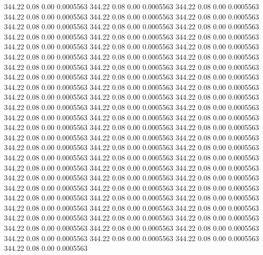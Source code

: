  344.22    0.08    0.00   0.0005563
 344.22    0.08    0.00   0.0005563
 344.22    0.08    0.00   0.0005563
 344.22    0.08    0.00   0.0005563
 344.22    0.08    0.00   0.0005563
 344.22    0.08    0.00   0.0005563
 344.22    0.08    0.00   0.0005563
 344.22    0.08    0.00   0.0005563
 344.22    0.08    0.00   0.0005563
 344.22    0.08    0.00   0.0005563
 344.22    0.08    0.00   0.0005563
 344.22    0.08    0.00   0.0005563
 344.22    0.08    0.00   0.0005563
 344.22    0.08    0.00   0.0005563
 344.22    0.08    0.00   0.0005563
 344.22    0.08    0.00   0.0005563
 344.22    0.08    0.00   0.0005563
 344.22    0.08    0.00   0.0005563
 344.22    0.08    0.00   0.0005563
 344.22    0.08    0.00   0.0005563
 344.22    0.08    0.00   0.0005563
 344.22    0.08    0.00   0.0005563
 344.22    0.08    0.00   0.0005563
 344.22    0.08    0.00   0.0005563
 344.22    0.08    0.00   0.0005563
 344.22    0.08    0.00   0.0005563
 344.22    0.08    0.00   0.0005563
 344.22    0.08    0.00   0.0005563
 344.22    0.08    0.00   0.0005563
 344.22    0.08    0.00   0.0005563
 344.22    0.08    0.00   0.0005563
 344.22    0.08    0.00   0.0005563
 344.22    0.08    0.00   0.0005563
 344.22    0.08    0.00   0.0005563
 344.22    0.08    0.00   0.0005563
 344.22    0.08    0.00   0.0005563
 344.22    0.08    0.00   0.0005563
 344.22    0.08    0.00   0.0005563
 344.22    0.08    0.00   0.0005563
 344.22    0.08    0.00   0.0005563
 344.22    0.08    0.00   0.0005563
 344.22    0.08    0.00   0.0005563
 344.22    0.08    0.00   0.0005563
 344.22    0.08    0.00   0.0005563
 344.22    0.08    0.00   0.0005563
 344.22    0.08    0.00   0.0005563
 344.22    0.08    0.00   0.0005563
 344.22    0.08    0.00   0.0005563
 344.22    0.08    0.00   0.0005563
 344.22    0.08    0.00   0.0005563
 344.22    0.08    0.00   0.0005563
 344.22    0.08    0.00   0.0005563
 344.22    0.08    0.00   0.0005563
 344.22    0.08    0.00   0.0005563
 344.22    0.08    0.00   0.0005563
 344.22    0.08    0.00   0.0005563
 344.22    0.08    0.00   0.0005563
 344.22    0.08    0.00   0.0005563
 344.22    0.08    0.00   0.0005563
 344.22    0.08    0.00   0.0005563
 344.22    0.08    0.00   0.0005563
 344.22    0.08    0.00   0.0005563
 344.22    0.08    0.00   0.0005563
 344.22    0.08    0.00   0.0005563
 344.22    0.08    0.00   0.0005563
 344.22    0.08    0.00   0.0005563
 344.22    0.08    0.00   0.0005563
 344.22    0.08    0.00   0.0005563
 344.22    0.08    0.00   0.0005563
 344.22    0.08    0.00   0.0005563
 344.22    0.08    0.00   0.0005563
 344.22    0.08    0.00   0.0005563
 344.22    0.08    0.00   0.0005563
